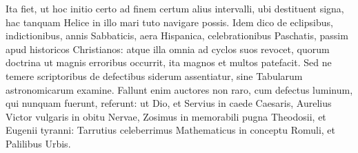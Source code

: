 Ita fiet, ut
hoc initio certo ad finem certum alius intervalli, ubi destituent signa,
hac tanquam Helice in illo mari tuto navigare possis.
Idem dico de eclipsibus, indictionibus, annis Sabbaticis,
 aera Hispanica,
celebrationibus Paschatis, passim apud historicos Christianos: atque
illa omnia ad cyclos suos revocet, quorum doctrina ut magnis erroribus
occurrit, ita magnos et multos patefacit.
Sed ne temere scriptoribus
de defectibus siderum assentiatur, sine Tabularum astronomicarum
examine.
Fallunt enim auctores non raro, cum defectus
luminum, qui nunquam fuerunt, referunt: ut Dio, et Servius in
caede Caesaris, Aurelius Victor vulgaris in obitu Nervae, Zosimus in
memorabili pugna Theodosii, et Eugenii tyranni: Tarrutius celeberrimus
Mathematicus in conceptu Romuli, et Palilibus Urbis.


